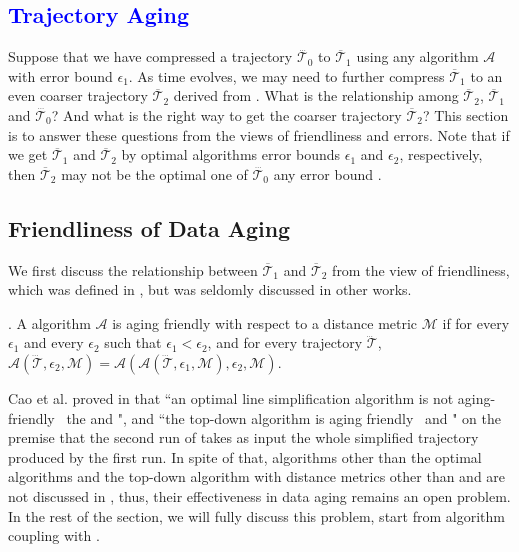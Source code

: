 
\textcolor{blue}{\section{Trajectory Aging}}
\label{sec-aging}

Suppose that we have compressed a trajectory $\dddot{\mathcal{T}_0}$ to $\overline{\mathcal{T}}_1$ using any \lsa algorithm $\mathcal{A}$ with error bound $\epsilon_1$. As time evolves, we may need to further compress $\overline{\mathcal{T}}_1$ to an even coarser trajectory $\overline{\mathcal{T}}_2$ derived from .
What is the relationship among $\overline{\mathcal{T}}_2$, $\overline{\mathcal{T}}_1$ and $\dddot{\mathcal{T}_0}$? And what is the right way to get the coarser trajectory $\overline{\mathcal{T}}_2$?
%
This section is to answer these questions from the views of friendliness \cite{Cao:Spatio} and errors.
Note that if we get $\overline{\mathcal{T}}_1$ and $\overline{\mathcal{T}}_2$ by optimal algorithms \wrt error bounds $\epsilon_1$ and $\epsilon_2$, respectively, then $\overline{\mathcal{T}}_2$ may not be the optimal one of $\dddot{\mathcal{T}_0}$ \wrt any error bound \cite{Cao:Spatio}. 

\subsection{Friendliness of Data Aging}
We first discuss the relationship between $\overline{\mathcal{T}}_1$ and $\overline{\mathcal{T}}_2$ from the view of friendliness, which was defined in \cite{Cao:Spatio}, but was seldomly discussed in other works.
	
. {A \lsa algorithm $\mathcal{A}$ is aging friendly with respect to a distance metric $\mathcal{M}$ if for every $\epsilon_1$ and every $\epsilon_2$ such that $\epsilon_1 < \epsilon_2$, and for every trajectory $\dddot{\mathcal{T}}$, $\mathcal{A}(\dddot{\mathcal{T}}, \epsilon_2, \mathcal{M})= \mathcal{A}(\mathcal{A}(\dddot{\mathcal{T}}, \epsilon_1, \mathcal{M}), \epsilon_2, \mathcal{M})$.}

Cao et al. proved in \cite{Cao:Spatio} that ``an optimal line simplification algorithm is not aging-friendly \wrt~the \ped and \sed", and ``the top-down algorithm \dpa is aging friendly \wrt~\ped and \sed" on the premise that the second run of \dpa takes as input the whole simplified trajectory produced by the first run.
In spite of that, algorithms other than the optimal algorithms and the top-down algorithm \dpa with distance metrics other than \ped and \sed are not discussed in \cite{Cao:Spatio}, thus, their effectiveness in data aging remains an open problem.
In the rest of the section, we will fully discuss this problem, start from algorithm \opt coupling with \dad.

